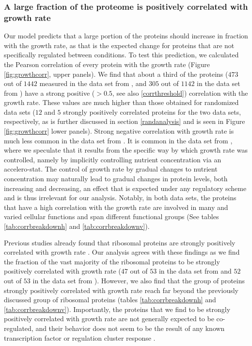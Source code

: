 \documentclass{article}
\newcommand{\hTotal}{$1442$}
\newcommand{\hGlobal}{$473$}
\newcommand{\hGlobalShuff}{$12$}
\newcommand{\vnTotal}{$1142$}
\newcommand{\vTotal}{\vnTotal{}}
\newcommand{\vnGlobalShuff}{$5$}
\newcommand{\vGlobalShuff}{\vnGlobalShuff{}}
\newcommand{\vnGlobal}{$305$}
\newcommand{\vGlobal}{\vnGlobal{}}
\newcommand{\hRibs}{$53$}
\newcommand{\hCorrRibs}{$47$}
\newcommand{\vnRibs}{$53$}
\newcommand{\vRibs}{\vnRibs{}}
\newcommand{\vnCorrRibs}{$52$}
\newcommand{\vCorrRibs}{\vnCorrRibs{}}
\begin{document}
\subsubsection{A large fraction of the proteome is positively correlated with growth rate}
Our model predicts that a large portion of the proteins should increase in fraction with the growth rate, as that is the expected change for proteins that are not specifically regulated between conditions.
To test this prediction, we calculated the Pearson correlation of every protein with the growth rate (Figure \ref{fig:growthcorr}, upper panels).
We find that about a third of the proteins (\hGlobal{} out of \hTotal{} measured in the data set from \cite{Heinemann2015}, and \vGlobal{} out of \vTotal{} in the data set from \cite{Peebo_2015}) have a strong positive ($>0.5$, see also \ref{corrthreshold}) correlation with the growth rate.
These values are much higher than those obtained for randomized data sets (\hGlobalShuff{} and \vGlobalShuff{} strongly positively correlated proteins for the two data sets, respectively, as is further discussed in section \ref{randanalysis} and is seen in Figure \ref{fig:growthcorr} lower panels).
Strong negative correlation with growth rate is much less common in the data set from \cite{Heinemann2015}.
It is common in the data set from \cite{Peebo_2015}, where we speculate that it results from the specific way by which growth rate was controlled, namely by implicitly controlling nutrient concentration via an accelero-stat.
The control of growth rate by gradual changes to nutrient concentration may naturally lead to gradual changes in protein levels, both increasing and decreasing, an effect that is expected under any regulatory scheme and is thus irrelevant for our analysis. 
Notably, in both data sets, the proteins that have a high correlation with the growth rate are involved in many and varied cellular functions and span different functional groups (See tables \ref{tab:corrbreakdownh} and \ref{tab:corrbreakdownv}).

Previous studies already found that ribosomal proteins are strongly positively correlated with growth rate \cite{Pedersen1978a, ingraham1983growth, Klumpp2008}.
Our analysis agrees with these findings as we find the fraction of the vast majority of the ribosomal proteins to be strongly positively correlated with growth rate (\hCorrRibs{} out of \hRibs{} in the data set from \cite{Heinemann2015} and \vCorrRibs{} out of \vRibs{} in the data set from \cite{Peebo_2015}).
However, we also find that the group of proteins strongly positively correlated with growth rate reach far beyond the previously discussed group of ribosomal proteins (tables \ref{tab:corrbreakdownh} and \ref{tab:corrbreakdownv}).
Importantly, the proteins that we find to be strongly positively correlated with growth rate are not generally expected to be co-regulated, and their behavior does not seem to be the result of any known transcription factor or regulation cluster response \cite{23203884}.
\end{document}
